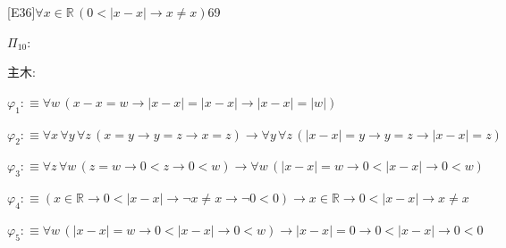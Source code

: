 \begin{fullproof}{[E36]}{$\forall x \in \mathbb{R}\,(0 < \lvert x - x \rvert \to x \neq x)$}{69}
\begin{ptree}
\end{ptree}
\noindent$\Pi_{10}$:
\begin{ptree}
\noLine
{}
\end{ptree}
\noindent 主木:
\begin{ptree}
\noLine
{}
\end{ptree}
\begin{abbrevlist}
\item $\varphi_{1} :\equiv \forall w\,(x - x = w \to \lvert x - x \rvert = \lvert x - x \rvert \to \lvert x - x \rvert = \lvert w \rvert)$
\item $\varphi_{2} :\equiv \forall x\,\forall y\,\forall z\,(x = y \to y = z \to x = z) \to \forall y\,\forall z\,(\lvert x - x \rvert = y \to y = z \to \lvert x - x \rvert = z)$
\item $\varphi_{3} :\equiv \forall z\,\forall w\,(z = w \to 0 < z \to 0 < w) \to \forall w\,(\lvert x - x \rvert = w \to 0 < \lvert x - x \rvert \to 0 < w)$
\item $\varphi_{4} :\equiv (x \in \mathbb{R} \to 0 < \lvert x - x \rvert \to \neg x \neq x \to \neg 0 < 0) \to x \in \mathbb{R} \to 0 < \lvert x - x \rvert \to x \neq x$
\item $\varphi_{5} :\equiv \forall w\,(\lvert x - x \rvert = w \to 0 < \lvert x - x \rvert \to 0 < w) \to \lvert x - x \rvert = 0 \to 0 < \lvert x - x \rvert \to 0 < 0$

\end{abbrevlist}
\end{fullproof}
